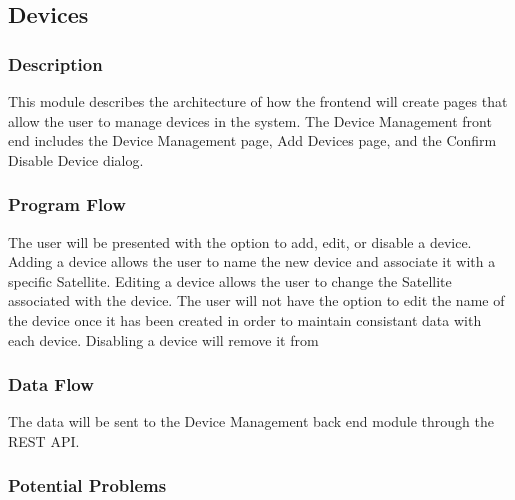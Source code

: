 
\subsection{Devices}

\subsubsection{Description}

This module describes the architecture of how the frontend will create pages that allow the user to manage devices in the system. 
The Device Management front end includes the Device Management page, Add Devices page, and the Confirm Disable Device dialog. 


\subsubsection{Program Flow}

The user will be presented with the option to add, edit, or disable a device. 
Adding a device allows the user to name the new device and associate it with a specific Satellite. 
Editing a device allows the user to change the Satellite associated with the device. 
The user will not have the option to edit the name of the device once it has been created in order to maintain consistant data with each device. 
Disabling a device will remove it from 


\subsubsection{Data Flow}

The data will be sent to the Device Management back end module through the REST API. 




\subsubsection{Potential Problems}



